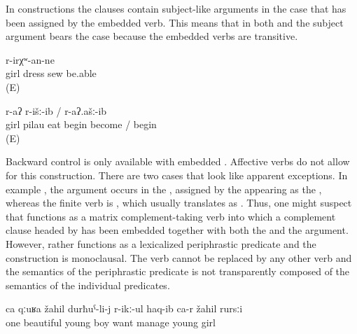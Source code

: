 In  constructions the clauses contain subject-like arguments in the  case that has been assigned by the embedded verb. This means that in both  and  the subject argument bears the  case because the embedded verbs are transitive.
%
\begin{exe}
	\ex	\label{ex:‎The girl will be able to sew the dress}
		r-irχʷ-an-ne\\
		girl	dress	sew	be.able\\
	\glt	{} (E)

	\ex	\label{ex:‎The girl began to eat the pilau}
		r-aʔ	r-išː-ib	/	r-aʔ.ašː-ib\\
		girl pilau	eat \tsc{f-}begin	become	/ begin\\
	\glt	{} (E)
\end{exe}

Backward control is only available with embedded . Affective verbs do not allow for this construction. There are two cases that look like apparent exceptions. In example , the  argument occurs in the , assigned by the    appearing as the , whereas the finite verb is , which usually translates as . Thus, one might suspect that  functions as a matrix complement-taking verb into which a complement clause headed by  has been embedded together with both the  and the  argument. However,  rather functions as a lexicalized periphrastic predicate and the construction is monoclausal. The verb  cannot be replaced by any other verb and the semantics of the periphrastic predicate is not transparently composed of the semantics of the individual predicates.
%
\begin{exe}
	\ex	\label{ex:‎One beautiful young man fell in love with a young girl}
	\gll	ca	qːuʁa	žahil	durħuˁ-li-j	r-ikː-ul	haq-ib	ca-r	žahil	rursːi\\
		one	beautiful	young	boy	want	manage		young	girl\\
	\glt	{} 
\end{exe}

